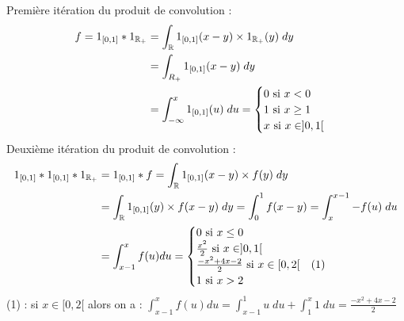 \begin{example}
    Première itération du produit de convolution :
    \begin{align*}
        f = 1_{[0,1]} \ast 1_{\mathbb{R}_+} &= \int_{\mathbb{R}} 1_{[0,1]}(x-y) \times 1_{\mathbb{R}_+}(y) \; dy \\
        &= \int_{R_+} 1_{[0,1]}(x-y) \; dy  \\ 
          &= \int_{- \infty}^{x} 1_{[0,1]}(u) \; du = 
          \begin{cases}
            0 \text{ si } x < 0 \\ 
            1 \text{ si } x \geq 1 \\ 
            x \text{ si } x \in ]0,1[ 
          \end{cases}
    \end{align*}
    Deuxième itération du produit de convolution :
    \begin{align*}
        1_{[0,1]} \ast 1_{[0,1]} \ast 1_{\mathbb{R}_+} &= 1_{[0,1]} \ast f = \int_{\mathbb{R}} 1_{[0,1]}(x-y) \times f(y) \; dy \\ 
        &= \int_{\mathbb{R}} 1_{[0,1]}(y) \times f(x-y) \; dy = \int_{0}^{1} f(x-y) = \int_{x}^{x-1} -f(u) \; du \\
        &= \int_{x-1}^{x} f(u) du =
        \begin{cases}
            0 \text{ si } x \leq 0 \\
            \frac{x^2}{2} \text{ si } x \in ]0,1[ \\ 
            \frac{-x^2 + 4x -2}{2} \text{ si } x \in [0,2[ \quad (1)\\ 
            1 \text{ si } x > 2
        \end{cases} 
    \end{align*}
    (1) : si  $x \in [0,2[$ alors on a : $\int_{x-1}^{x} f(u) du = \int_{x-1}^{1} u \; du + \int_{1}^{x} 1 \; du =  \frac{-x^2 + 4x -2}{2} $
\end{example}


